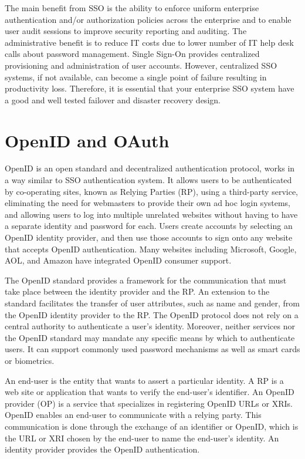 \begin{multicols}{2}
The main benefit from SSO is the ability to enforce uniform enterprise authentication and/or authorization policies across the enterprise and to enable user audit sessions to improve security reporting and auditing. The administrative benefit is to reduce IT costs due to lower number of IT help desk calls about password management. Single Sign-On provides centralized provisioning and administration of user accounts. However, centralized SSO systems, if not available, can become a single point of failure resulting in productivity loss. Therefore, it is essential that your enterprise SSO system have a good and well tested failover and disaster recovery design.

\section{OpenID and OAuth}

OpenID is an open standard and decentralized authentication protocol, works in a way similar to SSO authentication system. It allows users to be authenticated by co-operating sites, known as Relying Parties (RP), using a third-party service, eliminating the need for webmasters to provide their own ad hoc login systems, and allowing users to log into multiple unrelated websites without having to have a separate identity and password for each. Users create accounts by selecting an OpenID identity provider, and then use those accounts to sign onto any website that accepts OpenID authentication. Many websites including Microsoft, Google, AOL, and Amazon have integrated OpenID consumer support.

The OpenID standard provides a framework for the communication that must take place between the identity provider and the RP. An extension to the standard facilitates the transfer of user attributes, such as name and gender, from the OpenID identity provider to the RP. The OpenID protocol does not rely on a central authority to authenticate a user's identity. Moreover, neither services nor the OpenID standard may mandate any specific means by which to authenticate users. It can support commonly used password mechanisms as well as smart cards or biometrics.

An end-user is the entity that wants to assert a particular identity. A RP is a web site or application that wants to verify the end-user's identifier. An OpenID provider (OP) is a service that specializes in registering OpenID URLs or XRIs. OpenID enables an end-user to communicate with a relying party. This communication is done through the exchange of an identifier or OpenID, which is the URL or XRI chosen by the end-user to name the end-user's identity. An identity provider provides the OpenID authentication.


\end{multicols}
